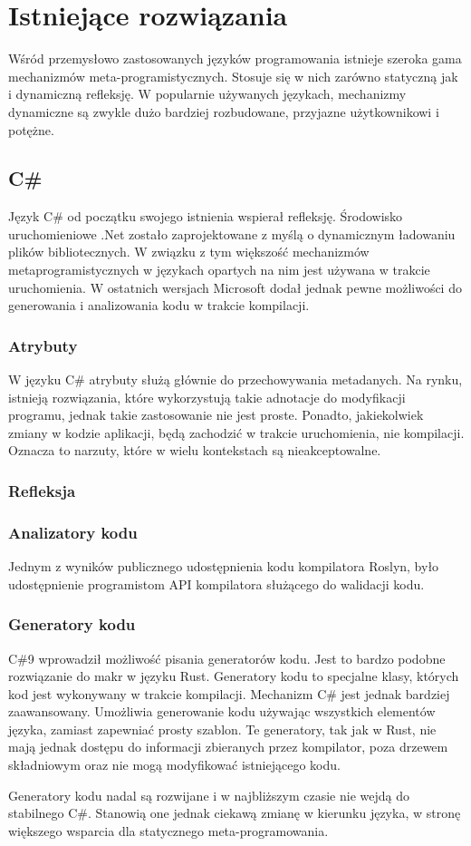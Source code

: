 \section{Istniejące rozwiązania}
Wśród przemysłowo zastosowanych języków programowania istnieje szeroka gama mechanizmów meta-programistycznych. Stosuje się w nich zarówno statyczną jak i dynamiczną refleksję. W popularnie używanych językach, mechanizmy dynamiczne są zwykle dużo bardziej rozbudowane, przyjazne użytkownikowi i potężne.

\subsection{C\#}
Język C\# od początku swojego istnienia wspierał refleksję.
Środowisko uruchomieniowe .Net zostało zaprojektowane z myślą o dynamicznym ładowaniu plików bibliotecznych.
W związku z tym większość mechanizmów metaprogramistycznych w językach opartych na nim jest używana w trakcie uruchomienia.
W ostatnich wersjach Microsoft dodał jednak pewne możliwości do generowania i analizowania kodu w trakcie kompilacji.
\subsubsection{Atrybuty}
W języku C\# atrybuty służą głównie do przechowywania metadanych.
Na rynku, istnieją rozwiązania, które wykorzystują takie adnotacje do modyfikacji programu, jednak takie zastosowanie nie jest proste.
Ponadto, jakiekolwiek zmiany w kodzie aplikacji, będą zachodzić w trakcie uruchomienia, nie kompilacji.
Oznacza to narzuty, które w wielu kontekstach są nieakceptowalne.
\subsubsection{Refleksja}
\subsubsection{Analizatory kodu}
Jednym z wyników publicznego udostępnienia kodu kompilatora Roslyn, było udostępnienie programistom API kompilatora służącego do walidacji kodu.

\subsubsection{Generatory kodu}
C\#9 wprowadził możliwość pisania generatorów kodu. Jest to bardzo podobne rozwiązanie do makr w języku Rust. Generatory kodu to specjalne klasy, których kod jest wykonywany w trakcie kompilacji. 
Mechanizm C\# jest jednak bardziej zaawansowany. Umożliwia generowanie kodu używając wszystkich elementów języka, zamiast zapewniać prosty szablon. Te generatory, tak jak w Rust, nie mają jednak dostępu do informacji zbieranych przez kompilator, poza drzewem składniowym oraz nie mogą modyfikować istniejącego kodu.\par
Generatory kodu nadal są rozwijane i w najbliższym czasie nie wejdą do stabilnego C\#. Stanowią one jednak ciekawą zmianę w kierunku języka, w stronę większego wsparcia dla statycznego meta-programowania.
